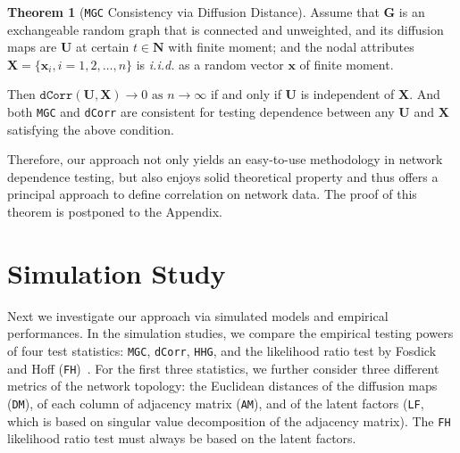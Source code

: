 \documentclass[11pt]{article}
\theoremstyle{definition}
\newtheorem{theorem}{Theorem}[section]
\begin{document}
\begin{theorem}[\texttt{MGC} Consistency via Diffusion Distance]
Assume that $\mathbf{G}$ is an exchangeable random graph that is connected and unweighted, and its diffusion maps are $\mathbf{U}$ at certain $t \in \mathbf{N}$ with finite moment; and the nodal attributes $\mathbf{X}=\{ \mathbf{x}_{i}, i = 1,2, \ldots, n \}$ is \textit{i.i.d.} as a random vector $\mathbf{x}$ of finite moment. 

Then $\texttt{dCorr}(\mathbf{U}, \mathbf{X}) \longrightarrow 0 \mbox{ as } n \rightarrow \infty$ if and only if $\mathbf{U}$ is independent of $\mathbf{X}$. And both \texttt{MGC} and \texttt{dCorr} are consistent for testing dependence between any $\mathbf{U}$ and $\mathbf{X}$ satisfying the above condition.
	\label{theoremMain}
\end{theorem}

Therefore, our approach not only yields an easy-to-use methodology in network dependence testing, but also enjoys solid theoretical property and thus offers a principal approach to define correlation on network data. The proof of this theorem is postponed to the Appendix.


\section{Simulation Study}
\label{sec:simulation}
	\vspace*{-0.2cm}
Next we investigate our approach via simulated models and empirical performances. In the simulation studies, we compare the empirical testing powers of four test statistics: \texttt{MGC}, \texttt{dCorr}, \texttt{HHG}, and the likelihood ratio test by Fosdick and Hoff (\texttt{FH})~\cite{fosdick2015testing}. For the first three statistics, we further consider three different metrics of the network topology: the Euclidean distances of the diffusion maps (\texttt{DM}), of each column of adjacency matrix (\texttt{AM}), and of the latent factors (\texttt{LF}, which is based on singular value decomposition of the adjacency matrix). The \texttt{FH} likelihood ratio test must always be based on the latent factors.
\end{document}
